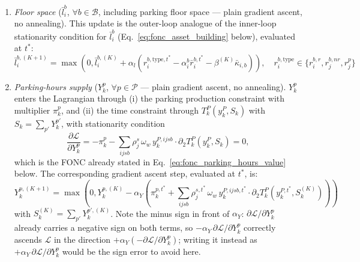 \documentclass[11pt,a4paper]{article}
\newcommand{\Proj}[1]{\max\left(0, #1\right)}
\begin{document}
\begin{enumerate}
\begin{enumerate}
\begin{enumerate}
            \item \emph{Floor space} ($\bar l_i^b$, $\forall b\in\mathcal{B}$, including parking floor space — plain gradient ascent, no annealing). This update is the outer-loop analogue of the inner-loop stationarity condition for $\bar l_i^b$ (Eq.~\ref{eq:fonc_asset_building} below), evaluated at $t^*$:
            \begin{equation}
                \bar l_i^{b,(K+1)} = \Proj{\bar l_i^{b,(K)} + \alpha_l \left( r_i^{b,\text{type},t^*} - \alpha_i^b \bar r_i^{b,t^*} - \beta^{(K)} \bar\kappa_{i,b} \right)}, \quad r_i^{b,\text{type}} \in \{r_i^{b,r}, r_j^{b,nr}, r_j^p\}
                \label{eq:outer_floorspace}
            \end{equation}

            \item \emph{Parking-hours supply} ($Y_k^p$, $\forall p \in \mathcal{P}$ — plain gradient ascent, no annealing). $Y_k^p$ enters the Lagrangian through (i) the parking production constraint with multiplier $\pi_k^p$, and (ii) the time constraint through $T^P_k(y_k^P, S_k)$ with $S_k = \sum_{p'} Y_k^{p'}$, with stationarity condition
            \begin{equation}
                \frac{\partial \mathcal{L}}{\partial Y_k^p} = -\pi_k^p - \sum_{ijsb} \rho_j^s\,\omega_w\, y_k^{P,ijsb} \cdot \partial_2 T^P_k(y_k^P, S_k) = 0,
            \end{equation}
            which is the FONC already stated in Eq.~\ref{eq:fonc_parking_hours_value} below. The corresponding gradient ascent step, evaluated at $t^*$, is:
            \begin{equation}
                Y_k^{p,(K+1)} = \Proj{Y_k^{p,(K)} - \alpha_Y \left( \pi_k^{p,t^*} + \sum_{ijsb} \rho_j^{s,t^*}\,\omega_w\, y_k^{P,ijsb,t^*} \cdot \partial_2 T^P_k\!\left(y_k^{P,t^*}, S_k^{(K)}\right) \right)}
                \label{eq:outer_parking_supply}
            \end{equation}
            with $S_k^{(K)} = \sum_{p'} Y_k^{p',(K)}$. Note the minus sign in front of $\alpha_Y$: $\partial\mathcal{L}/\partial Y_k^p$ already carries a negative sign on both terms, so $-\alpha_Y\,\partial\mathcal{L}/\partial Y_k^p$ correctly ascends $\mathcal{L}$ in the direction $+\alpha_Y(-\partial\mathcal{L}/\partial Y_k^p)$; writing it instead as $+\alpha_Y\,\partial \mathcal{L}/\partial Y_k^p$ would be the sign error to avoid here.


\end{enumerate}
\end{enumerate}
\end{enumerate}
\end{document}
